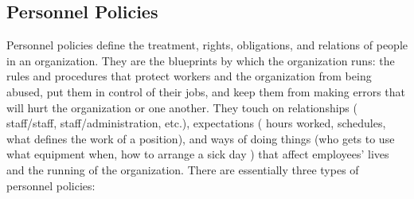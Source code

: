 \subsection{Personnel Policies}
Personnel policies define the treatment, rights, obligations, and relations of people in an organization. They
are the blueprints by which the organization runs: the rules and procedures that protect workers and the
organization from being abused, put them in control of their jobs, and keep them from making errors that will
hurt the organization or one another. They touch on relationships \big( staff/staff, staff/administration, etc.\big),
expectations \big( hours worked, schedules, what defines the work of a position\big), and ways of doing things \big(who
gets to use what equipment when, how to arrange a sick day \big) that affect employees' lives and the running of
the organization.
There are essentially three types of personnel policies:
